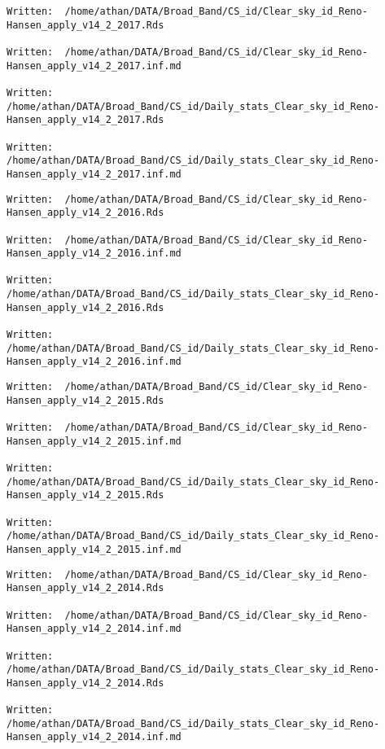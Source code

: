 \documentclass[
  10pt,
  a4paper,oneside]{article}
\begin{document}
\begin{verbatim}
Written:  /home/athan/DATA/Broad_Band/CS_id/Clear_sky_id_Reno-Hansen_apply_v14_2_2017.Rds 

Written:  /home/athan/DATA/Broad_Band/CS_id/Clear_sky_id_Reno-Hansen_apply_v14_2_2017.inf.md 

Written:  /home/athan/DATA/Broad_Band/CS_id/Daily_stats_Clear_sky_id_Reno-Hansen_apply_v14_2_2017.Rds 

Written:  /home/athan/DATA/Broad_Band/CS_id/Daily_stats_Clear_sky_id_Reno-Hansen_apply_v14_2_2017.inf.md 
\end{verbatim}

\begin{verbatim}
Written:  /home/athan/DATA/Broad_Band/CS_id/Clear_sky_id_Reno-Hansen_apply_v14_2_2016.Rds 

Written:  /home/athan/DATA/Broad_Band/CS_id/Clear_sky_id_Reno-Hansen_apply_v14_2_2016.inf.md 

Written:  /home/athan/DATA/Broad_Band/CS_id/Daily_stats_Clear_sky_id_Reno-Hansen_apply_v14_2_2016.Rds 

Written:  /home/athan/DATA/Broad_Band/CS_id/Daily_stats_Clear_sky_id_Reno-Hansen_apply_v14_2_2016.inf.md 
\end{verbatim}

\begin{verbatim}
Written:  /home/athan/DATA/Broad_Band/CS_id/Clear_sky_id_Reno-Hansen_apply_v14_2_2015.Rds 

Written:  /home/athan/DATA/Broad_Band/CS_id/Clear_sky_id_Reno-Hansen_apply_v14_2_2015.inf.md 

Written:  /home/athan/DATA/Broad_Band/CS_id/Daily_stats_Clear_sky_id_Reno-Hansen_apply_v14_2_2015.Rds 

Written:  /home/athan/DATA/Broad_Band/CS_id/Daily_stats_Clear_sky_id_Reno-Hansen_apply_v14_2_2015.inf.md 
\end{verbatim}

\begin{verbatim}
Written:  /home/athan/DATA/Broad_Band/CS_id/Clear_sky_id_Reno-Hansen_apply_v14_2_2014.Rds 

Written:  /home/athan/DATA/Broad_Band/CS_id/Clear_sky_id_Reno-Hansen_apply_v14_2_2014.inf.md 

Written:  /home/athan/DATA/Broad_Band/CS_id/Daily_stats_Clear_sky_id_Reno-Hansen_apply_v14_2_2014.Rds 

Written:  /home/athan/DATA/Broad_Band/CS_id/Daily_stats_Clear_sky_id_Reno-Hansen_apply_v14_2_2014.inf.md 
\end{verbatim}
\end{document}
